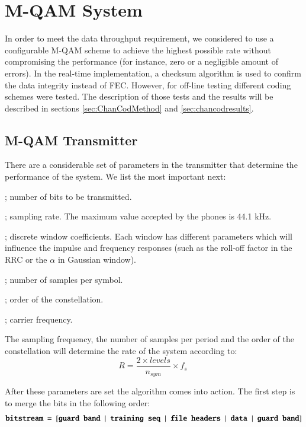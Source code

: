 \documentclass[12pt,a4paper,openright]{report}
\begin{document}
\section{M-QAM System}
In order to meet the data throughput requirement, we considered to use a configurable M-QAM scheme to achieve the highest possible rate without compromising the performance (for instance, zero or a negligible amount of errors). In the real-time implementation, a checksum algorithm  is used to confirm the data integrity instead of FEC. However, for off-line testing different coding schemes were tested. The description of those tests and the results will be described in sections \ref{sec:ChanCodMethod} and \ref{sec:chancodresults}.

\subsection{M-QAM Transmitter}
\label{sub:MQAMtx}
	There are a considerable set of parameters in the transmitter that determine the performance of the system. We list the most important next:



\begin{description}{\bfseries}
  \item[\bf{$N_b$}]; number of bits to be transmitted.
  \item[\bf{$f_s$}];  sampling rate. The maximum value accepted by the phones is 44.1 kHz.
  \item[\bf{Window}]; discrete window coefficients. Each window has different parameters which will influence the impulse and frequency responses (such as the roll-off factor in the RRC or the $\alpha$ in Gaussian window).
\item[\bf{$n_{sym}$}]; number of samples per symbol. 
  \item[\bf{$levels$}]; order of the constellation. 
\item[\bf{$f_c$}]; carrier frequency. 
\end{description}


The sampling frequency, the number of samples per period and the order of the constellation will determine the rate of the system according to:
\begin{equation}
R = \frac{{2 \times levels}}{{n_{sym}}} \times f_s\ 
\end{equation}


After these parameters are set the algorithm comes into action. The first step is to merge the bits in the following order:
\[
\textbf{\texttt{bitstream = }} [\textbf{\texttt{guard band  }$\mid$\texttt{ training seq  }$ \mid $\texttt{ file headers   }$ \mid $\texttt{  data  }$ \mid $\texttt{  guard band}}]
\]
\end{document}
